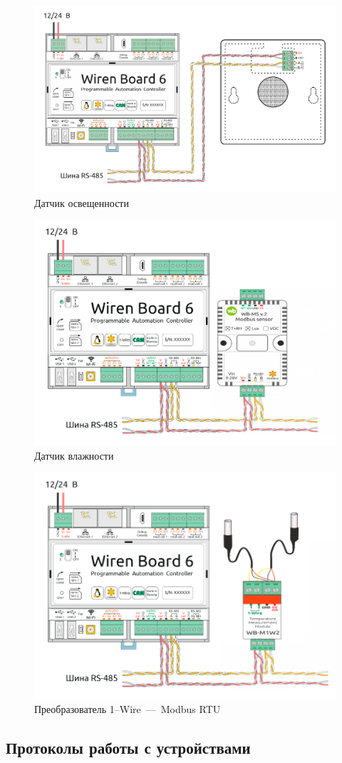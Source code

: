 \documentclass[a4paper,14pt]{extarticle}
\begin{document}
\begin{problem}
\begin{enumerate}
	\end{enumerate}
	
	\begin{figure}[h!]
		\centering
		\includegraphics[width=0.5\linewidth]{images/device-1}
		\caption{Датчик освещенности}
		\label{fig:device-1}
	\end{figure}
	
	\begin{figure}[h!]
		\centering
		\includegraphics[width=0.5\linewidth]{images/device-2}
		\caption{Датчик влажности}
		\label{fig:device-2}
	\end{figure}
	
	\begin{figure}[h!]
		\centering
		\includegraphics[width=0.5\linewidth]{images/device-3}
		\caption{Преобразователь 1--Wire~—~Modbus RTU}
		\label{fig:device-3}
	\end{figure}
\end{problem}


\newpage
\subsection{Протоколы работы с устройствами}
\end{document}
